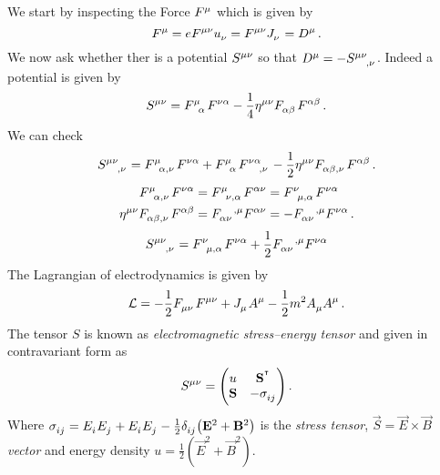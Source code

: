 \begin{example}[Electrodynamics]
We start by inspecting the  Force $\tensor{F}{^\mu}$ which is
given by
\begin{equation}
    \tensor{F}{^\mu}=e\tensor{F}{^\mu^\nu}\tensor{u}{_\nu}=\tensor{F}{^\mu^\nu}\tensor{J}{_\nu}=\tensor{D}{^\mu}\,
    .
\end{equation}
We now ask whether ther is a potential $\tensor{S}{^\mu^\nu}$ so that
$\tensor{D}{^\mu}=-\tensor{S}{^\mu^\nu_{,\nu}}$. Indeed a potential is given by
\begin{equation}
    \tensor{S}{^\mu^\nu}=\tensor{F}{^\mu_\alpha}\tensor{F}{^\nu^\alpha}-\frac{1}{4}\tensor{\eta}{^\mu^\nu}\tensor{F}{_\alpha_\beta}\tensor{F}{^\alpha^\beta}\,
    .
\end{equation}
We can check
\begin{equation}
    \tensor{S}{^\mu^\nu_{,\nu}}=\tensor{F}{^\mu_\alpha_{,\nu}}\tensor{F}{^\nu^\alpha}+
    \tensor{F}{^\mu_\alpha}\tensor{F}{^\nu^\alpha_{,\nu}}
    -\frac{1}{2}\tensor{\eta}{^\mu^\nu}\tensor{F}{_\alpha_\beta_{,\nu}}\tensor{F}{^\alpha^\beta}\,
    .
\end{equation}
\begin{align}
    \tensor{F}{^\mu_\alpha_{,\nu}}\tensor{F}{^\nu^\alpha}
    &=\tensor{F}{^\mu_\nu_{,\alpha}}\tensor{F}{^\alpha^\nu}
    =\tensor{F}{^\nu_\mu_{,\alpha}}\tensor{F}{^\nu^\alpha}
    \\
    \tensor{\eta}{^\mu^\nu}\tensor{F}{_\alpha_\beta_{,\nu}}\tensor{F}{^\alpha^\beta}
    &=\tensor{F}{_\alpha_\nu^{,\mu}}\tensor{F}{^\alpha^\nu}
    = -\tensor{F}{_\alpha_\nu^{,\mu}}\tensor{F}{^\nu^\alpha}
    \,
    .
\end{align}
\begin{equation}
\tensor{S}{^\mu^\nu_{,\nu}}=\tensor{F}{^\nu_\mu_{,\alpha}}\tensor{F}{^\nu^\alpha}
+\frac{1}{2}\tensor{F}{_\alpha_\nu^{,\mu}}\tensor{F}{^\nu^\alpha}
\end{equation}
The Lagrangian of electrodynamics is given by
\begin{equation}
    \mathcal{L}=-\frac{1}{2}\tensor{F}{_\mu_\nu}\tensor{F}{^\mu^\nu}+\tensor{J}{_\mu}\tensor{A}{^\mu}-\frac{1}{2}m^2\tensor{A}{_\mu}\tensor{A}{^\mu}\,
    .
\end{equation}
 The tensor $S$ is known as \emph{electromagnetic stress–energy tensor} and
 given in contravariant form as
\begin{equation}
\tensor{S}{^\mu^\nu}=
\begin{pmatrix}
u&\vec{S}\transpose\\
\vec{S}& -\tensor{\sigma}{_i_j}
\end{pmatrix}\,.
\end{equation}
Where
$\tensor{\sigma}{_i_j}=\tensor{E}{_i}\tensor{E}{_j}+\tensor{E}{_i}\tensor{E}{_j}-\frac{1}{2}\tensor{\delta}{_i_j}\left(\vec{E}^2+\vec{B}^2\right)$
is the \emph{ stress tensor}, $\vec{S}=\vec{E}\times\vec{B}$
\emph{ vector} and energy density $u
=\frac{1}{2}\left(\vec{E}^2+\vec{B}^2\right)$.
\end{example}
